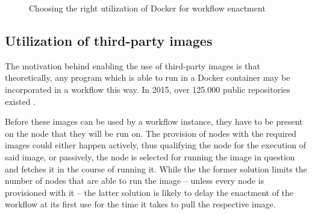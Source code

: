   \begin{figure}[htbp]
    \centering
    \newdimen\nodeDist
    \nodeDist=35mm
    \caption{Choosing the right utilization of Docker for workflow enactment}
    \label{fig:choosing_docker_utilization}
  \end{figure}

\subsection{Utilization of third-party images} %
\label{sub:execution_of_third_party_containers}
  The motivation behind enabling the use of third-party images is that theoretically, any program which is able to run in a Docker container may be incorporated in a workflow this way. In 2015, over 125.000 public repositories existed \cite{Dehamer2015Docker}.

  Before these images can be used by a workflow instance, they have to be present on the node that they will be run on. The provision of nodes with the required images could either happen actively, thus qualifying the node for the execution of said image, or passively, \ie the node is selected for running the image in question and fetches it in the course of running it. While the the former solution limits the number of nodes that are able to run the image -- unless every node is provisioned with it -- the latter solution is likely to delay the enactment of the workflow at its first use for the time it takes to pull the respective image.

